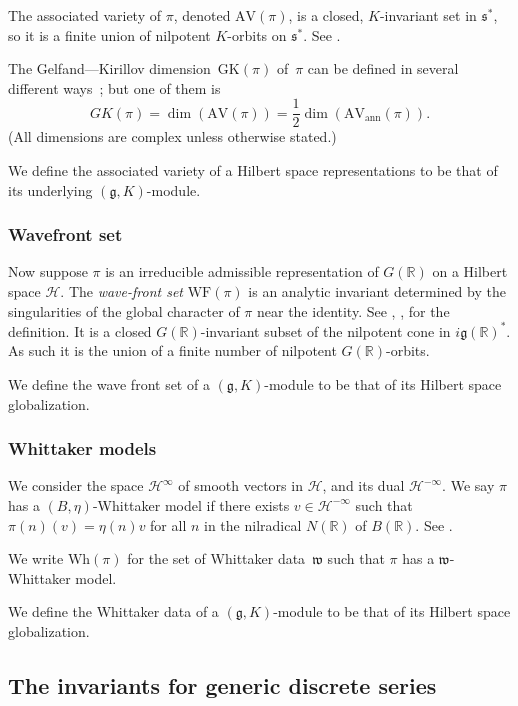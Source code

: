 \documentclass[10pt,leqno]{article}
\newcommand{\mH}{\mathcal H}
\newcommand{\R}{\mathbb R}
\newcommand{\g}{\mathfrak g}
\newcommand{\s}{\mathfrak s}
\newcommand{\w}{\mathfrak w}
\newcommand{\AV}{\mathrm{AV}}
\newcommand{\Wh}{\mathrm{Wh}}
\newcommand{\WF}{\mathrm{WF}}
\newcommand{\AVann}{\mathrm{AV}_{\mathrm{ann}}}
\newcommand{\GK}{\mathrm{GK}}
\begin{document}
The associated variety of $\pi$, denoted $\AV(\pi)$, is a closed, $K$-invariant set in $\s^*$, so it is a finite union of
nilpotent $K$-orbits on $\s^*$. See \cite[Section 5]{vogan_bowdoin}.

The Gelfand---Kirillov dimension~$\GK(\pi)$ of~$\pi$ can be defined in several different ways~\cite{vogan-gelfand-kirillov}; but one of them is
$$
GK(\pi)=\dim(\AV(\pi))=\frac12\dim(\AVann(\pi)).
$$
(All dimensions are complex unless otherwise stated.)


We define the associated variety of a Hilbert space representations to be that of  its underlying $(\g,K)$-module.


\subsubsection*{Wavefront set}

Now suppose $\pi$ is an irreducible admissible representation of $G(\R)$ on a Hilbert space $\mH$. 
The \emph{wave-front
  set} $\WF(\pi)$ is an analytic invariant determined by the
singularities of the global character of $\pi$ near the identity. See \cite{howe_wave_front}, \cite{bv_local_structure},
\cite{HarrisHeOlafsson} for the definition. 
It is a closed $G(\R)$-invariant subset of the nilpotent cone in
$i\g(\R)^*$. As such it is the union of a finite number of nilpotent $G(\R)$-orbits.

We define the wave front set of a $(\g,K)$-module to be that of its 
Hilbert space globalization.

\subsubsection*{Whittaker models}

We consider the space $\mH^\infty$ of smooth vectors in $\mH$, and its dual $\mH^{-\infty}$. We say $\pi$ has a $(B,\eta)$-Whittaker model
if there exists $v\in \mH^{-\infty}$ such that $\pi(n)(v)=\eta(n)v$ for all $n$ in the nilradical $N(\R)$ of $B(\R)$.
See \cite{matumoto}. 

We write $\Wh(\pi)$ for the set of Whittaker data~$\w$ such that $\pi$ has a $\w$-Whittaker model.

We define the Whittaker data  of a $(\g,K)$-module to be that of its 
Hilbert space globalization.



\subsection{The invariants for generic discrete series} 
\end{document}
